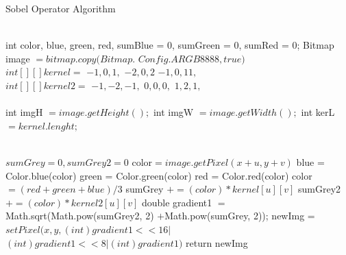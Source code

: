 \documentclass[conference]{IEEEtran}
\begin{document}
\begin{algorithm}
   \caption{Sobel Operator Algorithm}
    \begin{algorithmic}[1]
		\\
        \State int color, blue, green, red, sumBlue = 0, sumGreen = 0,				 \State sumRed = 0;
        \State  Bitmap image $= bitmap.copy(Bitmap.$
        \State $Config.ARGB8888, true)$
\\
		\State $int[ ][ ] kernel =$
          \State ${-1, 0, 1},$
          \State ${-2, 0, 2}$
                        \State ${-1, 0, 11},$
                        \\
                        \State $int[ ][ ] kernel2 =$
          \State ${-1, -2, -1},$
          \State ${0,0,0},$
                        \State ${1,2,1},$
                        \\
                        \\
         \State int imgH $= image.getHeight(); $
        \State int imgW $= image.getWidth(); $
       \State int kerL $= kernel.lenght; $
        
\\
            \State $sumGrey = 0, sumGrey2 = 0$
						\State color$= image.getPixel(x+u,y+v)$
						\State blue = Color.blue(color)
            				\State green = Color.green(color)
            				\State red = Color.red(color)
            				\State color $= (red+green+blue)/3$
            				\State sumGrey $+= (color) * kernel[u][v]$
            				\State sumGrey2 $+= (color) * kernel2[u][v]$
            			\EndFor
				\EndFor
				\State double gradient1 
				\State $=$ Math.sqrt(Math.pow(sumGrey2, 2)
				\State$+$Math.pow(sumGrey, 2));
				\State newImg = $ setPixel(x, y,  (int)gradient1<<16 | $ 
				\State $(int)gradient1<<8 | (int)gradient1)$
        		\EndFor
        \EndFor
        \State return newImg
       \EndFunction

\end{algorithmic}
\end{algorithm}
\end{document}
